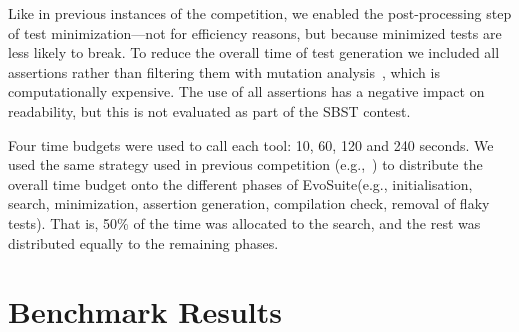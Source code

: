 \documentclass[sigconf,table]{acmart}
\newcommand{\EVOSUITE}{{\sc EvoSuite}\xspace}
\newcommand{\TT}{{\sc T3}\xspace}
\begin{document}
Like in previous instances of the competition, we enabled the
post-processing step of test minimization---not for efficiency
reasons, but because minimized tests are less likely to break. To
reduce the overall time of test generation we included all assertions
rather than filtering them with mutation
analysis~\cite{10.1109/TSE.2011.93}, which is computationally
expensive. The use of all assertions has a negative impact on
readability, but this is not evaluated as part of the SBST contest.

Four time budgets were used to call each tool: 10, 60, 120 and 240
seconds. We used the same strategy used in previous competition
(e.g.,~\cite{evosuiteAtSbst2016}) to distribute the overall time
budget onto the different phases of \EVOSUITE (e.g., initialisation,
search, minimization, assertion generation, compilation check, removal
of flaky tests). That is, 50\% of the time was allocated to the
search, and the rest was distributed equally to the remaining phases.


\section{Benchmark Results}

\begin{table*}[t]
  \centering
  \caption{\label{table:results}Detailed results of \EVOSUITE on the
    SBST benchmark classes.}
\vspace{-1em}
\resizebox{\textwidth}{!}{  

}	
\end{table*}

%

% 

% 
\end{document}

